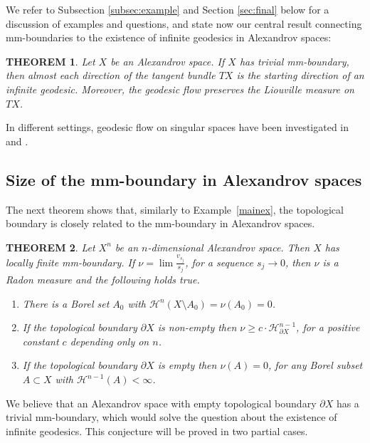 \documentclass[12pt,leqno,intlimits]{amsart}
\numberwithin{equation}{section}
\newtheorem{thm}{THEOREM}[section]
\theoremstyle{definition}
\theoremstyle{remark}
\newcommand{\exref}[1]{Example~\ref{#1}}
\begin{document}
We refer to Subsection \ref{subsec:example}  and Section \ref{sec:final}  below for a discussion of  examples and questions, and
 state now our central  result connecting  mm-boundaries to the existence  of infinite geodesics in Alexandrov spaces:

\begin{thm} \label{thmmain}
Let $X$ be an Alexandrov space. If $X$ has trivial mm-boundary, then  almost each direction of the tangent
bundle $TX$ is the starting direction of  an infinite geodesic. 
Moreover, the geodesic flow preserves the Liouville measure on $TX$.
\end{thm}

In different  settings, geodesic flow  on singular spaces have been investigated in \cite{BallmannBrin} and \cite{Bamler}.

\subsection{Size of the mm-boundary in Alexandrov spaces}
The next theorem shows that, similarly to \exref{mainex},  the topological boundary is closely related to the mm-boundary in Alexandrov spaces.

\begin{thm} \label{alexandrovthm}
Let $X^n$ be an  $n$-dimensional Alexandrov space. Then $X$ has locally finite mm-boundary.
If  $ \nu= \lim     \frac{v_{s_j}}{s_j}$,  for  a sequence  $s_j \to 0 $,  then $\nu$ is a Radon measure and
 the following holds true.
\begin{enumerate}
\item\label{full-measure-zero-nu}There is a Borel set $A_0$ with $\mathcal H^n (X\setminus A_0) = \nu (A_0)=0$.
\item\label{bry-nu} If the topological boundary $\partial X$ is non-empty then $\nu \geq c \cdot \mathcal H^{n-1} _{\partial X}$,
for a positive constant $c$ depending only on $n$.
\item \label{n-1-nu} If the topological boundary $\partial X$ is empty then $\nu (A)=0$, for any Borel subset $A\subset X$ with  $\mathcal H^{n-1} (A)<\infty$.
\end{enumerate}
\end{thm}

We believe that an Alexandrov space with empty topological boundary $\partial X$  has a trivial mm-boundary,
which would solve the question about the existence of infinite geodesics.
This conjecture will be proved in two partial cases.
\end{document}
